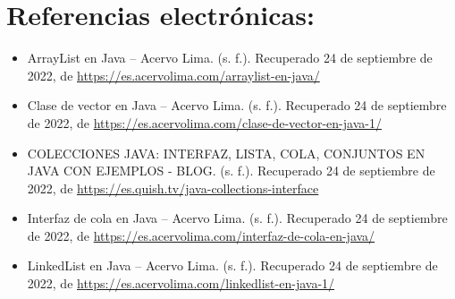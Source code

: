 \documentclass[12pt, letterpaper]{article} %
\begin{document}
\section*{Referencias electrónicas:}
\begin{itemize}
    \item ArrayList en Java – Acervo Lima. (s. f.). Recuperado 24 de septiembre de 2022, de \href{https://bit.ly/3fB4HAN}{https://es.acervolima.com/arraylist-en-java/}
    
    \item Clase de vector en Java – Acervo Lima. (s. f.). Recuperado 24 de septiembre de 2022, de \href{https://es.acervolima.com/clase-de-vector-en-java-1/}{https://es.acervolima.com/clase-de-vector-en-java-1/}
    
    \item COLECCIONES JAVA: INTERFAZ, LISTA, COLA, CONJUNTOS EN JAVA CON EJEMPLOS - BLOG. (s. f.). Recuperado 24 de septiembre de 2022, de \href{https://es.quish.tv/java-collections-interface}{https://es.quish.tv/java-collections-interface}
    
    \item Interfaz de cola en Java – Acervo Lima. (s. f.). Recuperado 24 de septiembre de 2022, de \href{https://es.acervolima.com/interfaz-de-cola-en-java/}{https://es.acervolima.com/interfaz-de-cola-en-java/}
    
    \item LinkedList en Java – Acervo Lima. (s. f.). Recuperado 24 de septiembre de 2022, de \href{https://es.acervolima.com/linkedlist-en-java-1/}{https://es.acervolima.com/linkedlist-en-java-1/}
\end{itemize}
\end{document}

